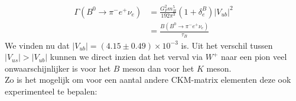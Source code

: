 \documentclass[../main.tex]{subfiles}
\begin{document}
\begin{equation}
    \begin{aligned}
        \label{eq:b_zwak_verval}
        \Gamma\left(B^{0} \rightarrow \pi^{-} e^{+} \nu_{e}\right) &=\frac{G_{F}^{2} m_{B}^{5}}{192 \pi^{3}}\left(1+\delta_{e}^{B}\right)\left|V_{u b}\right|^{2} \\
                                                                   &=\frac{B\left(B^{0} \rightarrow \pi^{-} e^{+} \nu_{e}\right)}{\tau_{B}}
    \end{aligned}
\end{equation}
We vinden nu dat $\left|V_{u b}\right|=(4.15 \pm 0.49) \times 10^{-3}$ is.\newpage
Uit het verschil tussen $\left|V_{us}\right| > \left|V_{u b}\right|$ kunnen we direct inzien dat het verval via $W^+$ naar een pion veel onwaarschijnlijker is voor het $B$ meson dan voor het $K$ meson.\\
Zo is het mogelijk om voor een aantal andere CKM-matrix elementen deze ook experimenteel te bepalen:
\end{document}
